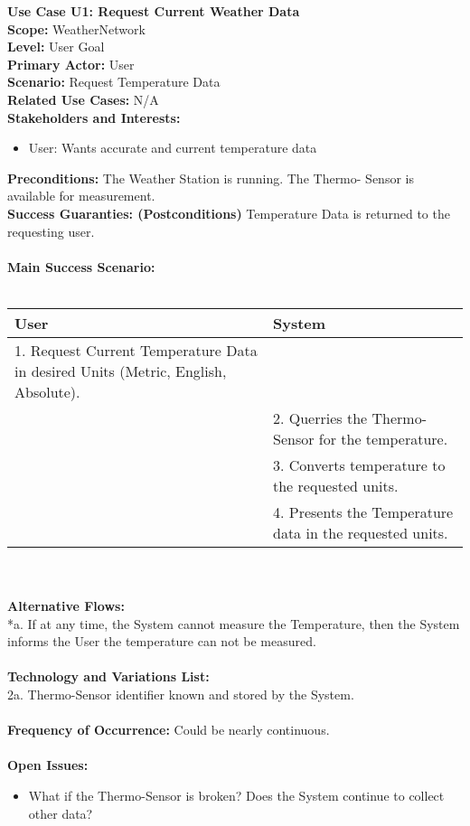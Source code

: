 \documentclass[letterpaper]{article}
\begin{document}
\noindent
\textbf{Use Case U1:  Request Current Weather Data}\\
\textbf{Scope:  }WeatherNetwork\\
\textbf{Level:  }User Goal\\
\textbf{Primary Actor:  }User\\
\textbf{Scenario:  }Request Temperature Data\\
\textbf{Related Use Cases:  }N/A\\
\textbf{Stakeholders and Interests:}
\begin{itemize}
\item User:  Wants accurate and current temperature data
\end{itemize}
\textbf{Preconditions:  }The Weather Station is running. The Thermo-
Sensor is available for measurement.\\
\textbf{Success Guaranties:  (Postconditions)} 
Temperature Data is returned to the requesting user.\\\\
\textbf{Main Success Scenario: }\\\\
\begin{tabular}{|p{6cm}|p{6cm}|}\hline
\textbf{User} & \textbf{System}\\\hline
1.  Request Current Temperature Data in desired Units (Metric,
English, Absolute). 
& \\\hline
&2.  Querries the Thermo-Sensor for the temperature.\\\hline
&3.  Converts temperature to the requested units.\\\hline
&4.  Presents the Temperature data in the requested units.\\\hline
\end{tabular}\\\\
\textbf{Alternative Flows:  }\\
*a.  If at any time, the System cannot measure the Temperature, then
the System informs the User the temperature can not be measured.\\\\
\textbf{Technology and Variations List:  }\\
2a.  Thermo-Sensor identifier known and stored by the System.\\\\
\textbf{Frequency of Occurrence:  }Could be nearly continuous.\\\\
\textbf{Open Issues:  }\\
\begin{itemize}
\item What if the Thermo-Sensor is broken?  Does the System continue
to collect other data?
\end{itemize}
\end{document}
